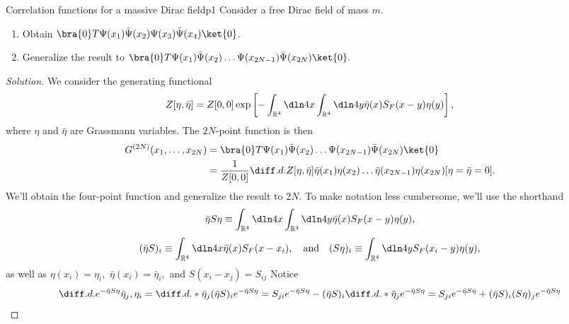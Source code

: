 \begin{problem}{Correlation functions for a massive Dirac field}{p1}
   Consider a free Dirac field of mass \(m\).
   \begin{enumerate}[label=(\alph*)]
      \item Obtain \(\bra{0}T \Psi(x_1) \bar{\Psi}(x_2) \Psi(x_3) \bar{\Psi}(x_4)\ket{0}\).
      \item Generalize the result to \(\bra{0} T \Psi(x_1) \bar{\Psi}(x_2) \dots \Psi(x_{2N - 1}) \bar{\Psi}(x_{2N})\ket{0}.\)
   \end{enumerate}
\end{problem}
\begin{proof}[Solution]
   We consider the generating functional
   \begin{equation*}
      Z[\eta, \bar{\eta}] = Z[0,0] \exp\left[- \int_{\mathbb{R}^4} \dln4x \int_{\mathbb{R}^4} \dln4y \bar{\eta}(x) S_F(x - y) \eta(y)\right],
   \end{equation*}
   where \(\eta\) and \(\bar{\eta}\) are Grassmann variables. The \(2N\)-point function is then
   \begin{align*}
      G^{(2N)}(x_1, \dots, x_{2N}) &= \bra{0} T \Psi(x_1) \bar{\Psi}(x_2) \dots \Psi(x_{2N - 1}) \bar{\Psi}(x_{2N})\ket{0}\\
                                   &= \frac{1}{Z[0,0]}\diff.d.{Z[\eta,\bar{\eta}]}{\bar{\eta}(x_{1})\eta(x_{2})\dots \bar{\eta}(x_{2N -1}) \eta(x_{2N})}[\eta = \bar{\eta} = 0].
   \end{align*}
   We'll obtain the four-point function and generalize the result to \(2N.\) To make notation less cumbersome, we'll use the shorthand 
   \begin{equation*}
      \bar{\eta} S \eta \equiv \int_{\mathbb{R}^4} \dln4x \int_{\mathbb{R}^4} \dln4{y} \bar{\eta}(x) S_F(x - y) \eta(y),
   \end{equation*}
   \begin{equation*}
      (\bar{\eta} S)_i \equiv \int_{\mathbb{R}^4} \dln4x \bar{\eta}(x) S_F(x - x_i),
      \quad\text{and}\quad
      (S \eta)_i \equiv \int_{\mathbb{R}^4} \dln4y S_F(x_i - y)\eta(y),
   \end{equation*}
   as well as \(\eta(x_i) = \eta_i,\) \(\bar{\eta}(x_i) = \bar{\eta}_i,\) and \(S(x_i - x_j) = S_{ij}\) Notice
   \begin{align*}
      \diff.d.{e^{- \bar{\eta} S \eta}}{\bar{\eta}_j,\eta_i} &= \diff.d.*{}{\bar{\eta}_j} (\bar{\eta} S)_i e^{- \bar{\eta} S \eta} = S_{ji} e^{- \bar{\eta} S \eta} - (\bar{\eta} S)_i \diff.d.*{}{\bar{\eta}_j} e^{-\bar{\eta}S\eta} = S_{ji} e^{- \bar{\eta} S \eta} + (\bar{\eta} S)_i (S \eta)_j e^{- \bar{\eta} S \eta}\\

\end{align*}
\end{proof}
